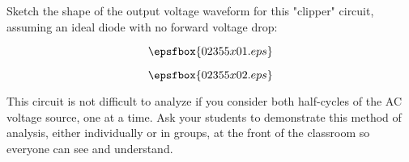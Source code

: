 

Sketch the shape of the output voltage waveform for this "clipper" circuit, assuming an ideal diode with no forward voltage drop:

$$\epsfbox{02355x01.eps}$$







$$\epsfbox{02355x02.eps}$$







This circuit is not difficult to analyze if you consider both half-cycles of the AC voltage source, one at a time.  Ask your students to demonstrate this method of analysis, either individually or in groups, at the front of the classroom so everyone can see and understand.




